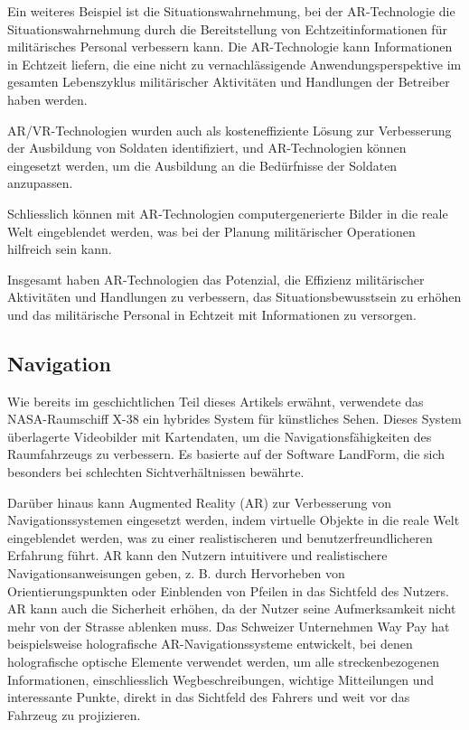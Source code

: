 Ein weiteres Beispiel ist die Situationswahrnehmung, bei der AR-Technologie die Situationswahrnehmung durch die Bereitstellung von Echtzeitinformationen für militärisches Personal verbessern kann. Die AR-Technologie kann Informationen in Echtzeit liefern, die eine nicht zu vernachlässigende Anwendungsperspektive im gesamten Lebenszyklus militärischer Aktivitäten und Handlungen der Betreiber haben werden. 

AR/VR-Technologien wurden auch als kosteneffiziente Lösung zur Verbesserung der Ausbildung von Soldaten identifiziert, und AR-Technologien können eingesetzt werden, um die Ausbildung an die Bedürfnisse der Soldaten anzupassen. 

Schliesslich können mit AR-Technologien computergenerierte Bilder in die reale Welt eingeblendet werden, was bei der Planung militärischer Operationen hilfreich sein kann. 

Insgesamt haben AR-Technologien das Potenzial, die Effizienz militärischer Aktivitäten und Handlungen zu verbessern, das Situationsbewusstsein zu erhöhen und das militärische Personal in Echtzeit mit Informationen zu versorgen. \cite{Virca2021ApplicationsOA}



\subsection{Navigation}
Wie bereits im geschichtlichen Teil dieses Artikels erwähnt, verwendete das NASA-Raumschiff X-38 ein hybrides System für künstliches Sehen. Dieses System überlagerte Videobilder mit Kartendaten, um die Navigationsfähigkeiten des Raumfahrzeugs zu verbessern. Es basierte auf der Software LandForm, die sich besonders bei schlechten Sichtverhältnissen bewährte. \cite{Delgado2001HybridSS}

Darüber hinaus kann Augmented Reality (AR) zur Verbesserung von Navigationssystemen eingesetzt werden, indem virtuelle Objekte in die reale Welt eingeblendet werden, was zu einer realistischeren und benutzerfreundlicheren Erfahrung führt. AR kann den Nutzern intuitivere und realistischere Navigationsanweisungen geben, z. B. durch Hervorheben von Orientierungspunkten oder Einblenden von Pfeilen in das Sichtfeld des Nutzers. AR kann auch die Sicherheit erhöhen, da der Nutzer seine Aufmerksamkeit nicht mehr von der Strasse ablenken muss. Das Schweizer Unternehmen Way Pay hat beispielsweise holografische AR-Navigationssysteme entwickelt, bei denen holografische optische Elemente verwendet werden, um alle streckenbezogenen Informationen, einschliesslich Wegbeschreibungen, wichtige Mitteilungen und interessante Punkte, direkt in das Sichtfeld des Fahrers und weit vor das Fahrzeug zu projizieren. \cite{WayRay}


